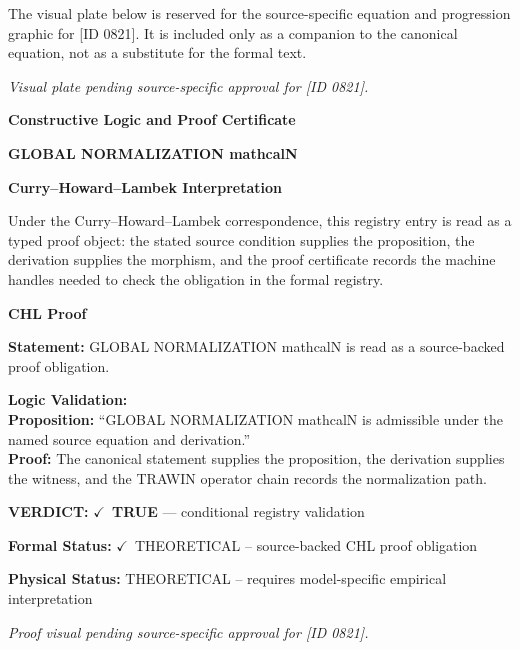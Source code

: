 \begingroup\footnotesize\sloppy
The visual plate below is reserved for the source-specific equation and progression graphic for [ID 0821]. It is included only as a companion to the canonical equation, not as a substitute for the formal text.
\par\endgroup
\begingroup\footnotesize\itshape
Visual plate pending source-specific approval for [ID 0821].
\par\endgroup

\clearpage
\begingroup\tzpsupportsetup
\noindent\textbf{\fontsize{10.8pt}{12.8pt}\selectfont [ID 0821] Constructive Logic and Proof Certificate}\par
\noindent\textbf{\fontsize{10pt}{12pt}\selectfont GLOBAL NORMALIZATION mathcalN}\par
\vspace{0.45em}
\begingroup
\footnotesize
\setlength{\parskip}{0.22em}
\setlength{\parindent}{0pt}
\noindent\textbf{Curry--Howard--Lambek Interpretation}\par
Under the Curry--Howard--Lambek correspondence, this registry entry is read as a typed proof
object: the stated source condition supplies the proposition, the derivation supplies the
morphism, and the proof certificate records the machine handles needed to check the obligation
in the formal registry.

\vspace{0.45em}
\noindent\textbf{CHL Proof}\par
\textbf{Statement:} GLOBAL NORMALIZATION mathcalN is read as a source-backed proof obligation.

\textbf{Logic Validation:}\\
\textbf{Proposition:} ``GLOBAL NORMALIZATION mathcalN is admissible under the named source equation and derivation.''\\
\textbf{Proof:} The canonical statement supplies the proposition, the derivation supplies the witness, and the TRAWIN operator chain records the normalization path.

\textbf{VERDICT:} \ensuremath{\checkmark}\ \textbf{TRUE} --- conditional registry validation

\textbf{Formal Status:} \ensuremath{\checkmark}\ THEORETICAL -- source-backed CHL proof obligation

\textbf{Physical Status:} THEORETICAL -- requires model-specific empirical interpretation
\par\vspace{0.45em}
\par
\vfill
\begingroup\footnotesize\itshape
Proof visual pending source-specific approval for [ID 0821].
\par\endgroup
\vfill
\endgroup
\endgroup

